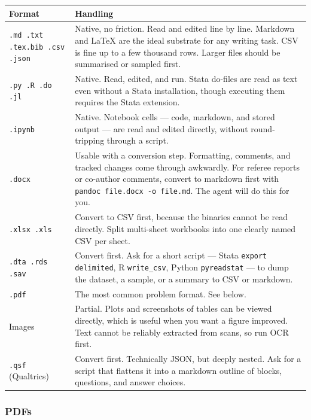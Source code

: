 \documentclass[11pt,a4paper]{article}
\newcommand{\code}[1]{\texttt{\small #1}}
\begin{document}
\begin{longtable}{@{}p{3.4cm}p{9.6cm}@{}}
\toprule
\textbf{Format} & \textbf{Handling} \\
\midrule
\endhead
\code{.md .txt .tex}\newline\code{.bib .csv .json} &
Native, no friction. Read and edited line by line. Markdown and LaTeX are the
ideal substrate for any writing task. CSV is fine up to a few thousand rows.
Larger files should be summarised or sampled first. \\
\addlinespace
\code{.py .R .do .jl} &
Native. Read, edited, and run. Stata do-files are read as text even without a
Stata installation, though executing them requires the Stata extension. \\
\addlinespace
\code{.ipynb} &
Native. Notebook cells --- code, markdown, and stored output --- are read and
edited directly, without round-tripping through a script. \\
\addlinespace
\code{.docx} &
Usable with a conversion step. Formatting, comments, and tracked changes come
through awkwardly. For referee reports or co-author comments, convert to
markdown first with \code{pandoc file.docx -o file.md}. The agent will do this
for you. \\
\addlinespace
\code{.xlsx .xls} &
Convert to CSV first, because the binaries cannot be read directly. Split multi-sheet
workbooks into one clearly named CSV per sheet. \\
\addlinespace
\code{.dta .rds .sav} &
Convert first. Ask for a short script --- Stata \code{export delimited}, R
\code{write\_csv}, Python \code{pyreadstat} --- to dump the dataset, a sample, or
a summary to CSV or markdown. \\
\addlinespace
\code{.pdf} &
The most common problem format. See below. \\
\addlinespace
Images &
Partial. Plots and screenshots of tables can be viewed directly, which is useful
when you want a figure improved. Text cannot be reliably extracted from scans, so run OCR first. \\
\addlinespace
\code{.qsf} (Qualtrics) &
Convert first. Technically JSON, but deeply nested. Ask for a script that
flattens it into a markdown outline of blocks, questions, and answer choices. \\
\bottomrule
\end{longtable}

\subsubsection{PDFs}
\end{document}
